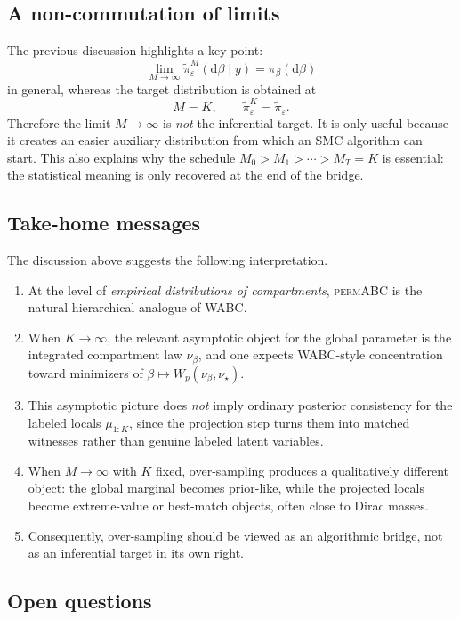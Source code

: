 \subsection{A non-commutation of limits}

The previous discussion highlights a key point:
\[
  \lim_{M\to\infty} \tilde\pi^{M}_{\varepsilon}(\mathrm d\beta\mid y)
  = \pi_\beta(\mathrm d\beta)
\]
in general, whereas the target distribution is obtained at
\[
  M = K,
  \qquad
  \tilde\pi^{K}_{\varepsilon} = \tilde\pi_{\varepsilon}.
\]
Therefore the limit $M\to\infty$ is \emph{not} the inferential target. It is only useful because it
creates an easier auxiliary distribution from which an SMC algorithm can start. This also explains
why the schedule $M_0 > M_1 > \cdots > M_T = K$ is essential: the statistical meaning is only
recovered at the end of the bridge.

\subsection{Take-home messages}

The discussion above suggests the following interpretation.
\begin{enumerate}
  \item At the level of \emph{empirical distributions of compartments}, \textsc{permABC} is the
  natural hierarchical analogue of WABC.
  \item When $K\to\infty$, the relevant asymptotic object for the global parameter is the
  integrated compartment law $\nu_\beta$, and one expects WABC-style concentration toward
  minimizers of $\beta \mapsto W_p(\nu_\beta,\nu_\star)$.
  \item This asymptotic picture does \emph{not} imply ordinary posterior consistency for the
  labeled locals $\mu_{1:K}$, since the projection step turns them into matched witnesses rather
  than genuine labeled latent variables.
  \item When $M\to\infty$ with $K$ fixed, over-sampling produces a qualitatively different
  object: the global marginal becomes prior-like, while the projected locals become extreme-value
  or best-match objects, often close to Dirac masses.
  \item Consequently, over-sampling should be viewed as an algorithmic bridge, not as an
  inferential target in its own right.
\end{enumerate}

\subsection{Open questions}

